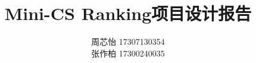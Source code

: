 \documentclass[12pt]{article} %
\title{\textbf{Mini-CS Ranking项目设计报告}}
\author{周芯怡 17307130354 \\张作柏 17300240035}
\begin{document}
\begin{sloppypar}
\maketitle

\pagestyle{fancy}
\lhead{\textbf{{\thetitle}}}
\rhead{\textbf{\nouppercase{\firstleftmark}}}
\cfoot{\thepage}

\thispagestyle{empty}
\tableofcontents
\thispagestyle{empty}
\clearpage

\setcounter{page}{1}








\end{sloppypar}
\end{document}
